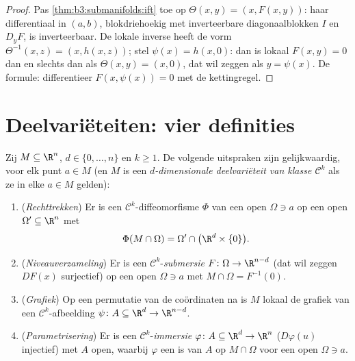\begin{proof}
Pas \cref{thm:b3:submanifolds:ift} toe op $\Theta(x, y) = (x,
F(x,y))$: haar differentiaal in $(a,b)$, blokdriehoekig met
inverteerbare diagonaalblokken $I$ en $D_yF$, is inverteerbaar.
De lokale inverse heeft de vorm $\Theta^{-1}(x, z) = (x, h(x,
z))$; stel $\psi(x) = h(x, 0)$: dan is lokaal $F(x, y) = 0$ dan
en slechts dan als $\Theta(x,y) = (x, 0)$, dat wil zeggen als $y
= \psi(x)$. De formule: differentieer $F(x, \psi(x)) = 0$ met de
kettingregel.
\end{proof}

\section{Deelvariëteiten: vier definities}

\begin{theorem}
\label{thm:b3:submanifolds:characterizations}
Zij $M \subseteq \R^n$, $d \in \{0, \dots, n\}$ en $k \geq 1$. De
volgende uitspraken zijn gelijkwaardig, voor elk punt $a \in M$
(en $M$ is een \emph{$d$-dimensionale deelvariëteit van klasse
$\mathcal C^k$} als ze in elke $a \in M$
gelden):
\begin{enumerate}
  \item (\emph{Rechttrekken}) Er is een $\mathcal
        C^k$-diffeomorfisme $\Phi$ van een open $\Omega \ni a$ op
        een open $\Omega' \subseteq \R^n$ met
        \[
        \Phi(M\cap\Omega) = \Omega' \cap
        \bigl(\R^d\times\{0\}\bigr).
        \]
  \item (\emph{Niveauverzameling}) Er is een $\mathcal
        C^k$-\emph{submersie} $F \colon \Omega \to \R^{n-d}$
        (dat wil zeggen $DF(x)$ surjectief) op een open $\Omega
        \ni a$ met $M\cap\Omega = F^{-1}(0)$.
  \item (\emph{Grafiek}) Op een permutatie van de coördinaten na
        is $M$ lokaal de grafiek van een $\mathcal
        C^k$-afbeelding $\psi \colon A \subseteq \R^d \to
        \R^{n-d}$.
  \item (\emph{Parametrisering}) Er is een $\mathcal
        C^k$-\emph{immersie} $\varphi \colon A \subseteq \R^d \to
        \R^n$ ($D\varphi(u)$ injectief) met $A$ open, waarbij
        $\varphi$ een  is van $A$ op $M \cap \Omega$
        voor een open $\Omega \ni a$.
\end{enumerate}
\end{theorem}

